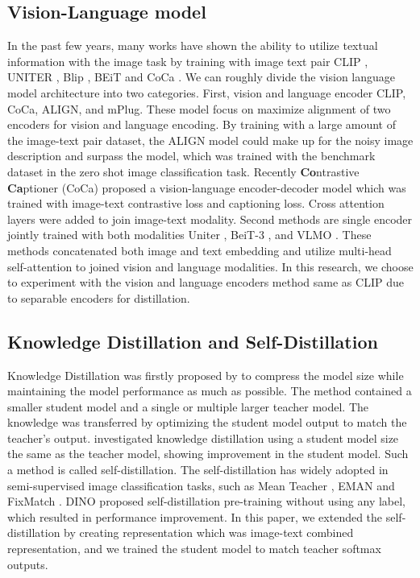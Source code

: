 \documentclass[10pt,twocolumn,letterpaper]{article}
\begin{document}
\subsection{Vision-Language model}
In the past few years, many works have shown the ability to utilize textual information with the image task by training with image text pair \eg CLIP \cite{clip}, UNITER \cite{uniter}, Blip \cite{blip-1,blip-2}, BEiT \cite{beit-3} and CoCa \cite{coca}.
We can roughly divide the vision language model architecture into two categories.
First, vision and language encoder \eg CLIP, CoCa, ALIGN, and mPlug.
These model focus on maximize alignment of two encoders for vision and language encoding.
By training with a large amount of the image-text pair dataset, the ALIGN model could make up for the noisy image description and surpass the model, which was trained with the benchmark dataset in the zero shot image classification task.
Recently \textbf{Co}ntrastive \textbf{Ca}ptioner (CoCa) \cite{coca} proposed a vision-language encoder-decoder model which was trained with image-text contrastive loss and captioning loss.
Cross attention layers were added to join image-text modality.
Second methods are single encoder jointly trained with both modalities \eg Uniter \cite{uniter}, BeiT-3 \cite{beit-3}, and VLMO \cite{vlmo}.
These methods concatenated both image and text embedding and utilize multi-head self-attention to joined vision and language modalities.
In this research, we choose to experiment with the vision and language encoders method same as CLIP due to separable encoders for distillation.

\subsection{Knowledge Distillation and Self-Distillation}
Knowledge Distillation was firstly proposed by \cite{knowledge_distill} to compress the model size while maintaining the model performance as much as possible.
The method contained a smaller student model and a single or multiple larger teacher model.
The knowledge was transferred by optimizing the student model output to match the teacher's output.
\cite{born_again} investigated knowledge distillation using a student model size the same as the teacher model, showing improvement in the student model.
Such a method is called self-distillation.
The self-distillation has widely adopted in semi-supervised image classification tasks, such as Mean Teacher \cite{mean_teacher}, EMAN \cite{eman} and FixMatch \cite{fixmatch}.
DINO \cite{dino} proposed self-distillation pre-training without using any label, which resulted in performance improvement.
In this paper, we extended the self-distillation by creating representation which was image-text combined representation, and we trained the student model to match teacher softmax outputs.
\end{document}
